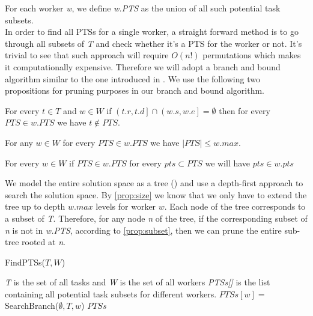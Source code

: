 For each worker \emph{w}, we define \emph{w.PTS} as the union of all such potential task subsets.\\

In order to find all PTSs for a single worker, a straight forward method is to go through all subsets of \emph{T} and check whether it's a PTS for the worker or not. It's trivial to see that such approach will require $O(n!)$ permutations which makes it computationally expensive. Therefore we will adopt a branch and bound algorithm similar to the one introduced in \cite{deng13}. We use the following two propositions for pruning purposes in our branch and bound algorithm.

\begin{proposition}
\label{prop:overlap}
For every $t \in T$ and $w \in W$ if $\left(t.r, t.d \right] \cap \left( w.s, w.e \right] = \emptyset$ then for every $PTS \in w.PTS$ we have $t \not\in PTS$.
\end{proposition}

\begin{proposition}
\label{prop:size}
For any $w \in W$ for every $PTS \in w.PTS$ we have $\left\vert{PTS}\right\vert \leq w.max$.
\end{proposition}

\begin{proposition}
\label{prop:subset}
For every $w \in W$ if $PTS \in w.PTS$ for every $pts \subset PTS$ we will have $pts \in w.pts$
\end{proposition}
We model the entire solution space as a tree () and use a depth-first approach to search the solution space. By \cref{prop:size} we know that we only have to extend the tree up to depth $w.max$ levels for worker $w$. Each node of the tree corresponds to a subset of \emph{T}. Therefore, for any node \emph{n} of the tree, if the corresponding subset of \emph{n} is not in \emph{w.PTS}, according to \cref{prop:subset}, then we can prune the entire sub-tree rooted at \emph{n}.

\begin{algorithm}[h]
\caption{FindPTSs($T, W$)}
\label{algo:FindPTS}
\begin{algorithmic}[1]
\REQUIRE \emph{T} is the set of all tasks and \emph{W} is the set of all workers
\ENSURE \emph{PTSs[]} is the list containing all potential task subsets for different workers.
	\STATE $PTSs[w] = $ SearchBranch($\emptyset, T, w$)
\ENDFOR
\RETURN $PTSs$
\end{algorithmic}
\end{algorithm}

